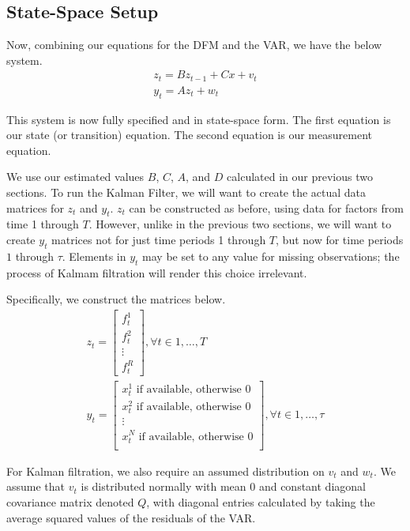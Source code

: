 \documentclass[11pt, letterpaper]{article}\usepackage[]{graphicx}\usepackage[]{color}
\begin{document}
\subsection{State-Space Setup}
Now, combining our equations for the DFM and the VAR, we have the below system.
\begin{align*}
z_t = B z_{t-1} + Cx + v_t\\
y_t = A z_t + w_t
\end{align*}

This system is now fully specified and in state-space form. The first equation is our state (or transition) equation. The second equation is our measurement equation. 

We use our estimated values $B$, $C$, $A$, and $D$ calculated in our previous two sections. To run the Kalman Filter, we will want to create the actual data matrices for $z_t$ and $y_t$. $z_t$ can be constructed as before, using data for factors from time 1 through $T$. However, unlike in the previous two sections, we will want to create $y_t$ matrices not for just time periods 1 through $T$, but now for time periods $1$ through $\tau$. Elements in $y_t$ may be set to any value for missing observations; the process of Kalmam filtration will render this choice irrelevant.

Specifically, we construct the matrices below.
\begin{align*}
z_t
=
\begin{bmatrix}
	f^1_{t}\\
	f^2_{t}\\
	\vdots \\
	f^R_{t}
\end{bmatrix}, \forall t \in 1, \dots, T\\
y_t
=
\begin{bmatrix}
	\text{$x^1_{t}$ if available, otherwise 0}\\
	\text{$x^2_{t}$ if available, otherwise 0}\\
	\vdots \\
	\text{$x^N_{t}$ if available, otherwise 0}\\
\end{bmatrix}, \forall t \in 1, \dots, \tau
\end{align*}

For Kalman filtration, we also require an assumed distribution on $v_t$ and $w_t$. We assume that $v_t$ is distributed normally with mean 0 and constant diagonal covariance matrix denoted $Q$, with diagonal entries calculated by taking the average squared values of the residuals of the VAR.
\end{document}
